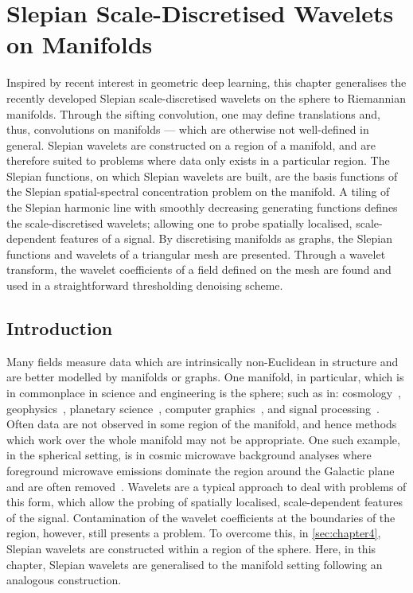 \chapter{Slepian Scale-Discretised Wavelets on Manifolds}\label{sec:chapter5}

Inspired by recent interest in geometric deep learning, this chapter generalises the recently developed Slepian scale-discretised wavelets on the sphere to Riemannian manifolds.
Through the sifting convolution, one may define translations and, thus, convolutions on manifolds --- which are otherwise not well-defined in general.
Slepian wavelets are constructed on a region of a manifold, and are therefore suited to problems where data only exists in a particular region.
The Slepian functions, on which Slepian wavelets are built, are the basis functions of the Slepian spatial-spectral concentration problem on the manifold.
A tiling of the Slepian harmonic line with smoothly decreasing generating functions defines the scale-discretised wavelets; allowing one to probe spatially localised, scale-dependent features of a signal.
By discretising manifolds as graphs, the Slepian functions and wavelets of a triangular mesh are presented.
Through a wavelet transform, the wavelet coefficients of a field defined on the mesh are found and used in a straightforward thresholding denoising scheme.

\section{Introduction}

Many fields measure data which are intrinsically non-Euclidean in structure and are better modelled by manifolds or graphs.
One manifold, in particular, which is in commonplace in science and engineering is the sphere; such as in: cosmology~\cite{Bennett1996}, geophysics~\cite{Simons2006}, planetary science~\cite{Turcotte1981}, computer graphics~\cite{Ramamoorthi2004}, and signal processing~\cite{Roddy2021a}.
Often data are not observed in some region of the manifold, and hence methods which work over the whole manifold may not be appropriate.
One such example, in the spherical setting, is in cosmic microwave background analyses where foreground microwave emissions dominate the region around the  Galactic plane and are often removed~\cite{Mortlock2002}.
Wavelets are a typical approach to deal with problems of this form, which allow the probing of spatially localised, scale-dependent features of the signal.
Contamination of the wavelet coefficients at the boundaries of the region, however, still presents a problem.
To overcome this, in \cref{sec:chapter4}, Slepian wavelets are constructed within a region of the sphere.
Here, in this chapter, Slepian wavelets are generalised to the manifold setting following an analogous construction.

